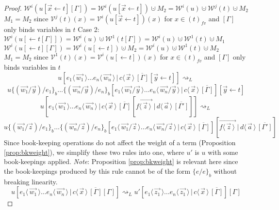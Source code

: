 \documentclass[a4paper,UKenglish,cleveref, autoref]{lipics-v2019}
\newcommand{\fv}[1]{(#1)_{fv}}
\newcommand{\share}[3]{#1 [#2 \leftarrow #3]}
\newcommand{\dist}[5]{#1 [ #2 \, \vert \, \fakedist{#4}{#5} \, #3 ]}
\newcommand{\fakedist}[2]{#1 \langle \, #2 \, \rangle}
\newcommand{\vecdist}[2]{\overrightarrow{\fakedist{#1}{#2} \,}}
\newcommand{\psub}[3]{#1 \{ #2 / #3 \}_{b}}
\newcommand{\weight}[2]{\mathcal{W}^{#1}(#2)}
\newcommand{\weightvar}[2]{\mathcal{V}^{#1}(#2)}
\begin{document}
\begin{proof}
$\weight{i}{\share{u}{\vec{x}}{t}[\Gamma]} = \weight{i}{\share{u}{\vec{x}}{t}} \cupdot M_{2} = \weight{i}{u} \cupdot \weight{j}{t} \cupdot M_{2}$
\newline
$M_{1} = M_{2}$ since $\weightvar{j}{t}(x) = \weightvar{i}{\share{u}{\vec{x}}{t}}(x)$ for $x \in \fv{t}$ and $[\Gamma]$ only binds variables in $t$
\newline
Case 2:
\newline
$\weight{i}{\share{u}{}{t[\Gamma]}} = \weight{i}{u} \cupdot \weight{1}{t[\Gamma]} = \weight{i}{u} \cupdot \weight{1}{t} \cupdot M_{1}$
\newline
$\weight{i}{\share{u}{}{t}[\Gamma]} = \weight{i}{\share{u}{}{t}} \cupdot M_{2} = \weight{i}{u} \cupdot \weight{1}{t} \cupdot M_{2}$
\newline
$M_{1} = M_{2}$ since $\weightvar{1}{t}(x) = \weightvar{i}{\share{u}{}{t}}(x)$ for $x \in \fv{t}$ and  $[\Gamma]$ only binds variables in $t$
\newline
$$\dist{u}{\fakedist{e_{1}}{\vec{w_{1}}} \dots \fakedist{e_{n}}{\vec{w_{n}}}}{\overline{[\Gamma]} \share{}{\vec{y}}{t}}{c}{\vec{x}} \rightsquigarrow_{L}$$ 
$$\dist{\psub{ \psub{u}{(\vec{w_{1}} / \vec{y})}{e_{1}} \dots}{(\vec{w_{n}} / \vec{y})}{e_{n}}}{\fakedist{e_{1}}{\vec{w_{1}} / \vec{y}} \dots \fakedist{e_{n}}{\vec{w_{n}} / \vec{y}}}{\overline{[\Gamma]}}{c}{\vec{x}} \share{}{\vec{y}}{t}$$
\newline
$$\dist{u}{\fakedist{e_{1}}{\vec{w_{1}}} \dots \fakedist{e_{n}}{\vec{w_{n}}}}{\overline{[\Gamma]} \dist{}{\vecdist{f}{\vec{z}}}{\overline{[\Gamma']}}
{d}{\vec{a}}}{c}{\vec{x}} \rightsquigarrow_{L}$$ 
$$\dist{\psub{ \psub{u}{(\vec{w_{1}} / \vec{z})}{e_{1}} \dots}{(\vec{w_{n}} / \vec{z})}{e_{n}}}{\fakedist{e_{1}}{\vec{w_{1}} / \vec{z}} \dots \fakedist{e_{n}}{\vec{w_{n}} / \vec{z}}}{\overline{[\Gamma]}}{c}{\vec{x}}  \dist{}{\vecdist{f}{\vec{z}}}{\overline{[\Gamma']}}{d}{\vec{a}}$$
Since book-keeping operations do not affect the weight of a term (Proposition \ref{prop:bkweight}), we simplify these two rules into one, where $u'$ is $u$ with some book-keepings applied.
\newline
\emph{Note}: Proposition \ref{prop:bkweight} is relevant here since the book-keepings produced by this rule cannot be of the form $\psub{}{e}{e}$ without breaking linearity.
$$\dist{u}{\fakedist{e_{1}}{\vec{w_{1}}} \dots \fakedist{e_{n}}{\vec{w_{n}}}}{\overline{[\Gamma]} [\Gamma]}{c}{\vec{x}} \rightsquigarrow_{L}\dist{u'}{\fakedist{e_{1}}{\vec{z_{1}}} \dots \fakedist{e_{n}}{\vec{z_{1}}}}{\overline{[\Gamma]}}{c}{\vec{x}}[\Gamma]$$

\end{proof}
\end{document}
